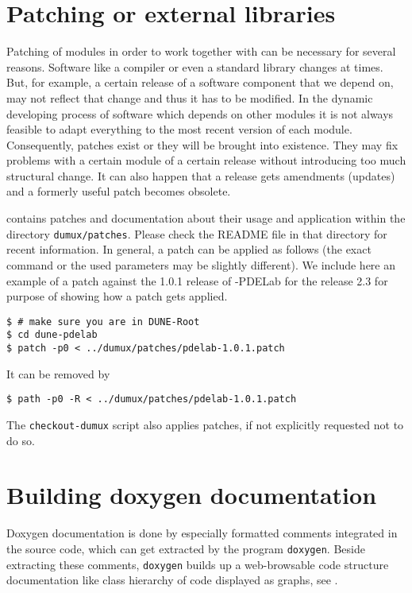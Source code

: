 \section{Patching \Dune or external libraries}
Patching of \Dune modules in order to work together with \Dumux can be necessary for several reasons.
Software like a compiler or even a standard library
changes at times. But, for example, a certain release of a software component that we depend on, 
may not reflect that change and thus it has to be modified.
In the dynamic developing process of software which depends on other modules it is not always feasible 
to adapt everything to the most recent version of each module. Consequently, patches exist or 
they will be brought into existence. They may fix problems with a certain module
of a certain release without introducing too much structural change. It can also happen 
that a release gets amendments (updates) and a formerly useful patch becomes obsolete.

\Dumux contains patches and documentation about their usage and application within the 
directory \texttt{dumux/patches}.
Please check the README file in that directory for recent information. 
In general, a patch can be applied as follows 
(the exact command or the used parameters may be slightly different).
We include here an example of a patch against the 1.0.1 release of \Dune-PDELab 
for the \Dumux release 2.3 for purpose of showing how a patch gets applied. 

\begin{lstlisting}[style=Bash]
$ # make sure you are in DUNE-Root
$ cd dune-pdelab
$ patch -p0 < ../dumux/patches/pdelab-1.0.1.patch
\end{lstlisting}

It can be removed by 
\begin{lstlisting}[style=Bash]
$ path -p0 -R < ../dumux/patches/pdelab-1.0.1.patch
\end{lstlisting}

The \texttt{checkout-dumux} script also applies patches, if not explicitly requested not to do so.


\section{Building doxygen documentation} \label{sec:build-doxy-doc}

Doxygen documentation is done by especially formatted comments integrated in the source code, which can get extracted by the program 
\texttt{doxygen}. Beside extracting these comments, \texttt{doxygen} builds up a web-browsable code structure documentation
like class hierarchy of code displayed as graphs, see \cite{DOXYGEN-HP}.


